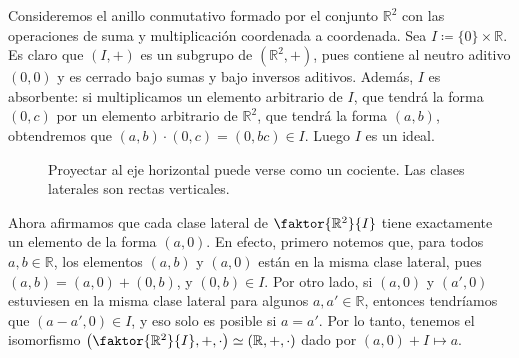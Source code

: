 \begin{example} \label{ejemplo_cociente_R2}
Consideremos el anillo conmutativo formado por el conjunto $\mathbb{R}^2$ con las operaciones de suma y multiplicación coordenada a coordenada. Sea $I \coloneqq \{ 0 \} \times \mathbb{R}$. Es claro que $(I, +)$ es un subgrupo de $(\mathbb{R}^2, +)$, pues contiene al neutro aditivo $(0, 0)$ y es cerrado bajo sumas y bajo inversos aditivos. Además, $I$ es absorbente: si multiplicamos un elemento arbitrario de $I$, que tendrá la forma $(0, c)$ por un elemento arbitrario de $\mathbb{R}^2$, que tendrá la forma $(a, b)$, obtendremos que
$(a, b) \cdot (0, c) = (0, bc) \in I$.
Luego $I$ es un ideal. 

\begin{figure}[h!] \centering
    \caption{\label{dibujo_cociente} Proyectar al eje horizontal puede verse como un cociente. Las clases laterales son rectas verticales.}
    \end{figure}

Ahora afirmamos que cada clase lateral de $\faktor{\mathbb{R}^2}{I}$ tiene exactamente un elemento de la forma $(a, 0)$. En efecto, primero notemos que, para todos $a, b \in \mathbb{R}$, los elementos $(a, b)$ y $(a, 0)$ están en la misma clase lateral, pues $(a, b) = (a, 0) + (0, b)$, y $(0, b) \in I$. Por otro lado, si $(a, 0)$ y $(a', 0)$ estuviesen en la misma clase lateral para algunos $a, a' \in \mathbb{R}$, entonces tendríamos que $(a-a', 0) \in I$, y eso solo es posible si $a = a'$. Por lo tanto, tenemos el isomorfismo $\left(\faktor{\mathbb{R}^2}{I}, +, \cdot\right) \simeq (\mathbb{R}, +, \cdot)$ dado por $(a, 0) + I \mapsto a$.


\end{example}
